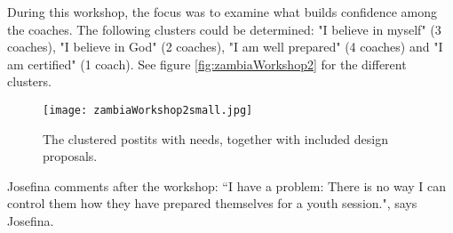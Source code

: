     During this workshop, the focus was to examine what builds confidence among the coaches. The following clusters could be determined: "I believe in myself" (3 coaches), "I believe in God" (2 coaches), "I am well prepared" (4 coaches) and "I am certified" (1 coach). See figure \ref{fig:zambiaWorkshop2} for the different clusters.

    \begin{figure}[h]
        \centering
        \texttt{[image: zambiaWorkshop2small.jpg]}
        \caption{The clustered postits with needs, together with included design proposals.}
        \label{fig:iteration}
    \end{figure}

    Josefina comments after the workshop: “I have a problem: There is no way I can control them how they have prepared themselves for a youth session.", says Josefina.
